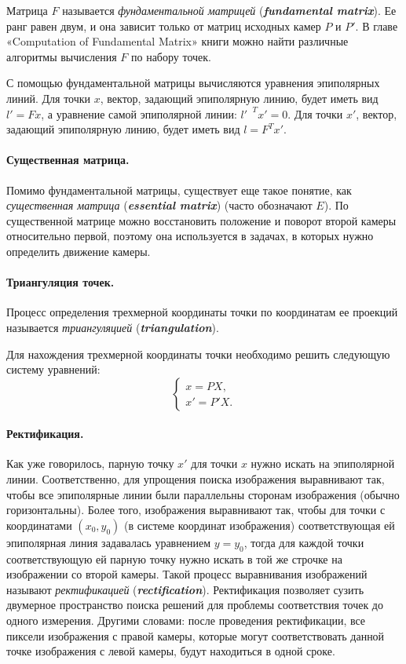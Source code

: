 \documentclass[oneside,final,12pt]{scrartcl}
\begin{document}
			Матрица \(F\) называется \textit{фундаментальной матрицей} (\textbf{\textit{fundamental matrix}}). Ее ранг равен двум, и она зависит только от матриц исходных камер \(P\) и \(P'\). В главе «Computation of Fundamental Matrix» книги \cite{Hartley2003} можно найти различные алгоритмы вычисления \(F\) по набору точек.

			С помощью фундаментальной матрицы вычисляются уравнения эпиполярных линий. Для точки \(x\), вектор, задающий эпиполярную линию, будет иметь вид \(l' = F x\), а уравнение самой эпиполярной линии: \(l'^{\text{ }T} x' = 0\). Для точки \(x'\), вектор, задающий эпиполярную линию, будет иметь вид \(l = F^{T} x'\).

			\paragraph{Существенная матрица.} Помимо фундаментальной матрицы, существует еще такое понятие, как \textit{существенная матрица}  (\textit{\textbf{essential matrix}}) (часто обозначают \(E\)). По существенной матрице можно восстановить положение и поворот второй камеры относительно первой, поэтому она используется в задачах, в которых нужно определить движение камеры.

			\paragraph{Триангуляция точек.} Процесс определения трехмерной координаты точки по координатам ее проекций называется \textit{триангуляцией} (\textit{\textbf{triangulation}}).

			Для нахождения трехмерной координаты точки необходимо решить следующую систему уравнений:
			\begin{equation}
				\begin{cases}
					x = PX,\\
					x' = P'X.
				\end{cases}
			\end{equation}

			\paragraph{Ректификация.} Как уже говорилось, парную точку \(x'\) для точки \(x\) нужно искать на эпиполярной линии. Соответственно, для упрощения поиска изображения выравнивают так, чтобы все эпиполярные линии были параллельны сторонам изображения (обычно горизонтальны). Более того, изображения выравнивают так, чтобы для точки с координатами \(\left(x_0, y_0\right)\) (в системе координат изображения) соответствующая ей эпиполярная линия задавалась уравнением \(y = y_0\), тогда для каждой точки соответствующую ей парную точку нужно искать в той же строчке на изображении со второй камеры. Такой процесс выравнивания изображений называют \textit{ректификацией} (\textit{\textbf{rectification}}). Ректификация позволяет сузить двумерное пространство поиска решений для проблемы соответствия точек до одного измерения. Другими словами: после проведения ректификации, все пиксели изображения с правой камеры, которые могут соответствовать данной точке изображения с левой камеры, будут находиться в одной сроке.
\end{document}
